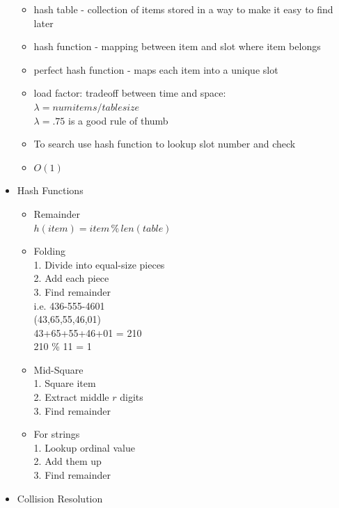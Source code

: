 \documentclass{article}
\begin{document}
\begin{multicols*}{3}
\begin{itemize}[noitemsep]
\begin{itemize}
            \item hash table - collection of items stored
            in a way to make it easy to find later
            \item hash function - mapping between item 
            and slot where item belongs
            \item perfect hash function - maps each item into 
            a unique slot
            \item load factor: tradeoff between time and space: \\
            $\lambda = num items/tablesize$ \\
            $\lambda = .75$ is a good rule of thumb
            \item To search use hash function to 
            lookup slot number and check
            \item $O(1)$
        \end{itemize}
    \item Hash Functions
        \begin{itemize}
            \item Remainder \\
            $h(item)=item\,\%\,len(table)$
            \item Folding \\
            1. Divide into equal-size pieces \\
            2. Add each piece \\
            3. Find remainder \\
            i.e. 436-555-4601 \\
            (43,65,55,46,01) \\
            43+65+55+46+01 = 210 \\
            210 \% 11 = 1
            \item Mid-Square \\
            1. Square item \\
            2. Extract middle $r$ digits \\
            3. Find remainder
            \item For strings \\
            1. Lookup ordinal value \\
            2. Add them up \\
            3. Find remainder
        \end{itemize}
    \item Collision Resolution
        \begin{itemize}

\end{itemize}
\end{itemize}
\end{multicols*}
\end{document}
